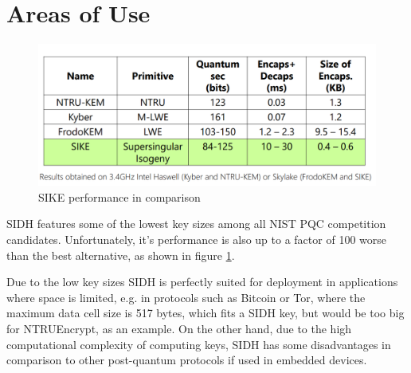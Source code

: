 \section{Areas of Use}

\begin{figure} 
	\centering
	\includegraphics[width=1\linewidth]{../img/performance}
	\caption{SIKE performance in comparison}
	\label{fig:performance}
\end{figure}

SIDH features some of the lowest key sizes among all NIST PQC competition candidates. Unfortunately, it's performance is also up to a factor of 100 worse than the best alternative, as shown in figure \ref{fig:performance}.


Due to the low key sizes SIDH is perfectly suited for deployment in applications where space is limited, e.g. in protocols such as Bitcoin or Tor, where the maximum data cell size is 517 bytes, which fits a SIDH key, but would be too big for NTRUEncrypt, as an example. On the other hand, due to the high computational complexity of computing keys, SIDH has some disadvantages in comparison to other post-quantum protocols if used in embedded devices.